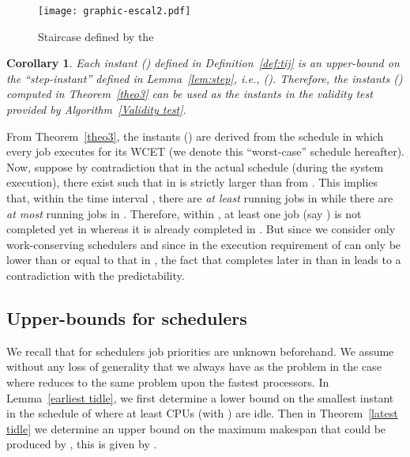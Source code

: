 \documentclass[10pt,english,a4paper]{article}
\newtheorem{corollary}{Corollary}
\newenvironment{proof}[1][Proof]{\begin{trivlist}
\item[\hskip \labelsep {\bfseries #1}]}{\end{trivlist}}
\newtheorem{validity test}{Validity Test}
\newcommand{\fin}{\hfill{\small }}     \newcommand{\oh}[1]{\ensuremath{\mathcal{0}{(#1)}}} \def\thefootnote{\arabic{footnote}}
\begin{document}
\begin{figure}[!h]
\centering
\texttt{[image: graphic-escal2.pdf]}
\caption{Staircase defined by the }
\label{fig:staircase}
\end{figure}

\begin{corollary}
Each instant  () defined in Definition~\ref{def:tij} is an upper-bound on the ``step-instant''  defined in Lemma~\ref{lem:step}, i.e.,  (). Therefore, the instants  () computed in Theorem~\ref{theo3} can be used as the instants  in the validity test provided by Algorithm~\ref{Validity test}.
\end{corollary}

\begin{proof}
From Theorem~\ref{theo3}, the instants  () are derived from the schedule in which every job executes for its WCET (we denote this ``worst-case'' schedule  hereafter). Now, suppose by contradiction that in the actual schedule  (during the system execution), there exist  such that  in  is strictly larger than  from . This implies that, within the time interval , there are \emph{at least}  running jobs in  while there are \emph{at most}  running jobs in . Therefore, within , at least one job (say ) is not completed yet in  whereas it is already completed in . But since we consider only work-conserving schedulers and since in  the execution requirement of  can only be lower than or equal to that in , the fact that  completes later in  than in  leads to a contradiction with the predictability. \fin
\end{proof}





\subsection{Upper-bounds for  schedulers}
\label{sec:proofsFJP}





 
We recall that for  schedulers job priorities are unknown beforehand. We assume without any loss of generality that we always have  as the problem in the case where  reduces to the same problem upon the  fastest processors. In Lemma~\ref{earliest tidle}, we first determine a lower bound on the smallest instant in the schedule of  where at least  CPUs (with ) are idle. Then in Theorem~\ref{latest tidle} we determine an upper bound on the maximum makespan that could be produced by , this is given by . 
\end{document}

